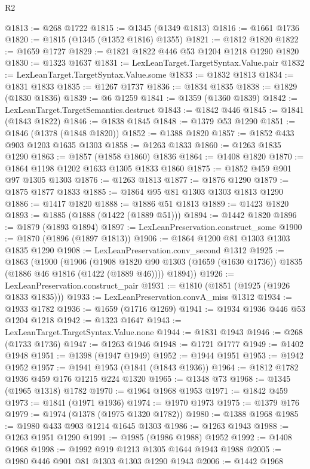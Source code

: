\begin{lexlean}{R2}
\begin{coremodule}
@1813 := @268 @1722
@1815 := @1345 (@1349 @1813)
@1816 := @1661 @1736
@1820 := @1815 (@1345 (@1352 @1816) @1355)
@1821 := @1812 @1820
@1822 := @1659 @1727
@1829 := @1821 @1822 @446 @53 @1204 @1218 @1290 @1820
@1830 := @1323 @1637
@1831 := LexLeanTarget.TargetSyntax.Value.pair
@1832 := LexLeanTarget.TargetSyntax.Value.some
@1833 := @1832 @1813
@1834 := @1831 @1833
@1835 := @1267 @1737
@1836 := @1834 @1835
@1838 := @1829 (@1830 @1836)
@1839 := @6 @1259
@1841 := @1359 (@1360 @1839)
@1842 := LexLeanTarget.TargetSemantics.destruct
@1843 := @1842 @446
@1845 := @1841 (@1843 @1822)
@1846 := @1838 @1845
@1848 := @1379 @53 @1290
@1851 := @1846 (@1378 (@1848 @1820))
@1852 := @1388 @1820
@1857 := @1852 @433 @903 @1203 @1635 @1303
@1858 := @1263 @1833
@1860 := @1263 @1835 @1290
@1863 := @1857 (@1858 @1860) @1836
@1864 := @1408 @1820
@1870 := @1864 @1198 @1202 @1633 @1305 @1833 @1860
@1875 := @1852 @459 @901 @97 @1305 @1303
@1876 := @1263 @1813
@1877 := @1876 @1290
@1879 := @1875 @1877 @1833
@1885 := @1864 @95 @81 @1303 @1303 @1813 @1290
@1886 := @1417 @1820
@1888 := @1886 @51 @1813
@1889 := @1423 @1820
@1893 := @1885 (@1888 (@1422 (@1889 @51)))
@1894 := @1442 @1820
@1896 := @1879 (@1893 @1894)
@1897 := LexLeanPreservation.construct_some
@1900 := @1870 (@1896 (@1897 @1813))
@1906 := @1864 @1200 @81 @1303 @1303 @1835 @1290
@1908 := LexLeanPreservation.conv_second @1312
@1925 := @1863
    (@1900
      (@1906
        (@1908 @1820 @90 @1303 (@1659 (@1630 @1736)) @1835 (@1886 @46 @1816 (@1422 (@1889 @46))))
        @1894))
@1926 := LexLeanPreservation.construct_pair
@1931 := @1810 (@1851 (@1925 (@1926 @1833 @1835)))
@1933 := LexLeanPreservation.convA_miss @1312
@1934 := @1933 @1782
@1936 := @1659 (@1716 @1269)
@1941 := @1934 @1936 @446 @53 @1204 @1218
@1942 := @1323 @1647
@1943 := LexLeanTarget.TargetSyntax.Value.none
@1944 := @1831 @1943
@1946 := @268 (@1733 @1736)
@1947 := @1263 @1946
@1948 := @1721 @1777
@1949 := @1402 @1948
@1951 := @1398 (@1947 @1949)
@1952 := @1944 @1951
@1953 := @1942 @1952
@1957 := @1941 @1953 (@1841 (@1843 @1936))
@1964 := @1812 @1782 @1936 @459 @176 @1215 @224 @1320
@1965 := @1348 @73
@1968 := @1345 (@1965 @1318) @1782
@1970 := @1964 @1968 @1953
@1971 := @1842 @459
@1973 := @1841 (@1971 @1936)
@1974 := @1970 @1973
@1975 := @1379 @176
@1979 := @1974 (@1378 (@1975 @1320 @1782))
@1980 := @1388 @1968
@1985 := @1980 @433 @903 @1214 @1645 @1303
@1986 := @1263 @1943
@1988 := @1263 @1951 @1290
@1991 := @1985 (@1986 @1988) @1952
@1992 := @1408 @1968
@1998 := @1992 @919 @1213 @1305 @1644 @1943 @1988
@2005 := @1980 @446 @901 @81 @1303 @1303 @1290 @1943
@2006 := @1442 @1968

\end{coremodule}
\end{lexlean}
